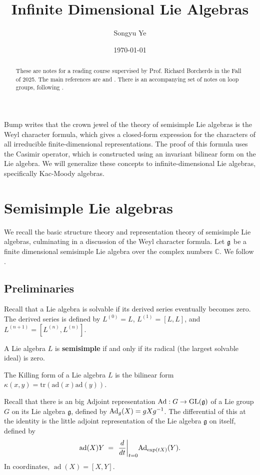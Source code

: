 \documentclass[12pt]{article}
\begin{document}
\rhead{\today}
\cfoot{\thepage}

\title{Infinite Dimensional Lie Algebras}

\author{Songyu Ye}
\date{\today}
\maketitle


\begin{abstract}
    These are notes for a reading course supervised by Prof. Richard Borcherds in the Fall of 2025. The main references are \cite{kac} and \cite{frenkel-ben-zvi}. There is an accompanying set of notes on loop groups, following \cite{pressley-segal}.
\end{abstract}
\tableofcontents
Bump \cite{bump} writes that the crown jewel of the theory of semisimple Lie algebras is the Weyl character formula, which gives a closed-form expression for the characters of all irreducible finite-dimensional representations. The proof of this formula uses the Casimir operator, which is constructed using an invariant bilinear form on the Lie algebra. We will generalize these concepts to infinite-dimensional Lie algebras, specifically Kac-Moody algebras.
\section{Semisimple Lie algebras}
We recall the basic structure theory and representation theory of semisimple Lie algebras, culminating in a discussion of the Weyl character formula. Let $\mathfrak{g}$ be a finite dimensional semisimple Lie algebra over the complex numbers $\mathbb{C}$. We follow \cite{bump}.
\subsection{Preliminaries}
\begin{definition}
    Recall that a Lie algebra is solvable if its derived series eventually becomes zero. The derived series is defined by $L^{(0)} = L$, $L^{(1)} = [L,L]$, and $L^{(n+1)} = [L^{(n)}, L^{(n)}]$.
\end{definition}

\begin{definition}
    A Lie algebra $L$ is \textbf{semisimple} if and only if its radical (the largest solvable ideal) is zero.
\end{definition}

\begin{definition}
    The Killing form of a Lie algebra $L$ is the bilinear form $\kappa(x,y) = \text{tr}(\text{ad}(x)\text{ad}(y))$.
\end{definition}
Recall that there is an big Adjoint representation $\operatorname{Ad}: G \to \operatorname{GL}(\mathfrak{g})$ of a Lie group $G$ on its Lie algebra $\mathfrak{g}$, defined by $\operatorname{Ad}_g(X) = gXg^{-1}$. The differential of this at the identity is the little adjoint representation of the Lie algebra $\mathfrak{g}$ on itself, defined by
\begin{align*}
    \operatorname{ad}(X)Y \;=\; \left.\frac{d}{dt}\right|_{t=0}\!\operatorname{Ad}_{\exp(tX)}(Y).
\end{align*}
In coordinates, $\operatorname{ad}(X) = [X,Y]$.
\end{document}

